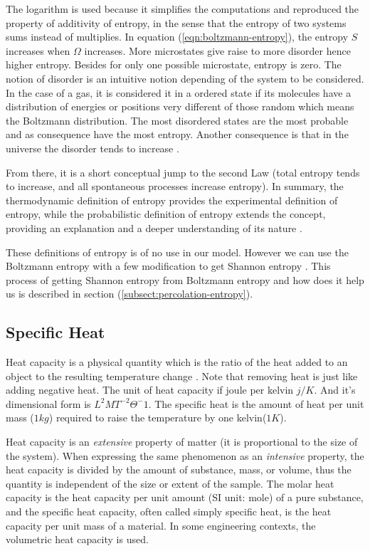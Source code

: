 		
		The logarithm is used because it simplifies the computations and reproduced the property of additivity of entropy, in the sense that the entropy of two systems sums instead of multiplies. In	equation (\ref{eqn:boltzmann-entropy}), the entropy $S$ increases when $\Omega$ increases. More microstates give raise to more disorder	hence higher entropy. Besides for only one possible microstate, entropy is zero. The notion of	disorder is an intuitive notion depending of the system to be considered. In the case of a gas, it	is considered it in a ordered state if its molecules have a distribution of energies or positions very	
		different of those random which means the Boltzmann distribution. The most disordered states are	the most probable and as consequence have the most entropy. Another consequence is that in the	universe the disorder tends to increase \cite{Balibrea2016}.
		
		
		From there, it is a short conceptual jump to the second Law (total entropy tends to increase, and	all spontaneous processes increase entropy). In summary, the thermodynamic definition of entropy provides the experimental definition of entropy, while the probabilistic definition of entropy	extends the concept, providing an explanation and a deeper understanding of its nature \cite{Alam2016}.
		
		These definitions of entropy is of no use in our model. However we can use the Boltzmann entropy with a few modification to get Shannon entropy \cite{Shannon1948}. This process of getting Shannon entropy from Boltzmann entropy and how does it help us is described in section (\ref{subsect:percolation-entropy}).

	
	\subsection{Specific Heat}
	Heat capacity is a physical quantity which is the ratio of the heat added to an object to the resulting temperature change \cite{Walker2013}. Note that removing heat is just like adding negative heat. The unit of heat capacity if joule per kelvin $j/K$. And it's dimensional form is $L^2MT^{-2}\Theta^-1$.	The specific heat is the amount of heat per unit mass ($1kg$) required to raise the temperature by one kelvin($1K$). 
	
	
	Heat capacity is an \textit{extensive} property of matter (it is proportional to the size of the system). When expressing the same phenomenon as an \textit{intensive} property, the heat capacity is divided by the amount of substance, mass, or volume, thus the quantity is independent of the size or extent of the sample. The molar heat capacity is the heat capacity per unit amount (SI unit: mole) of a pure substance, and the specific heat capacity, often called simply specific heat, is the heat capacity per unit mass of a material. In some engineering contexts, the volumetric heat capacity is used.
	
